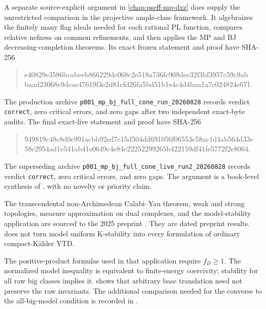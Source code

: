 A separate source-explicit argument in \cref{chap:pseff-mp-dxz}
does supply the unrestricted comparison in the projective ample-class
framework.  It algebraizes the finitely many flag ideals needed for each
rational PL function, compares relative nefness on common refinements, and
then applies the MP and BJ decreasing-completion theorems.  Its exact frozen
statement and proof have SHA-256
\begin{quote}
\footnotesize\ttfamily
e40829e3586bcabeeb866229dc068c2e518a736fc908dec32f3bf3957c59c9ab\\
baad23068e9dcae47619f3e2d81cfd26fa5bd51b1e4c4d4baa1a7c024824e671.
\end{quote}
The production archive
\nolinkurl{p001_mp_bj_full_cone_run_20260828} records verdict
\texttt{correct}, zero critical errors, and zero gaps after two independent
exact-byte audits.  The final exact-live statement and proof have SHA-256
\begin{quote}
\footnotesize\ttfamily
949819c48c8d0e991acbb92ed7c15d504dd691056f06553c58ac1d4ab564d33e\\
58c2954ad1e541ab41e0649c4e84e22252299265b422159df41fe5772f2e8064.
\end{quote}
The superseding archive
\nolinkurl{p001_mp_bj_full_cone_live_run2_20260828} records verdict
\texttt{correct}, zero critical errors, and zero gaps.  The argument is a book-level synthesis
of \cite{MP24,BJ22,DXZ23}, with no novelty or priority claim.

The transcendental non-Archimedean Calabi--Yau theorem, weak and strong
topologies, measure approximation on dual complexes, and the model-stability
application are sourced to the 2025 preprint \cite{MPWN25}.  They are dated
preprint results.   does not turn model uniform K-stability into
every formulation of ordinary compact-Kähler YTD.

The positive-product formulas used in that application require
\(f_D\geq1\).  The normalized model inequality is equivalent to
finite-energy coercivity; stability for all raw big classes implies it.
 shows that arbitrary base
translation need not preserve the raw invariants.
The additional comparison needed for the converse to the all-big-model
condition is recorded in .

